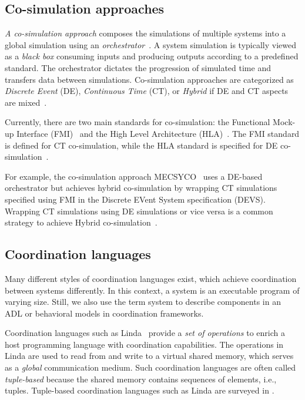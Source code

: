 \documentclass[runningheads]{llncs}
\begin{document}
\subsection{Co-simulation approaches} \label{subsec: cosim}

\textit{A co-simulation approach} composes the simulations of multiple systems into a global simulation using an \textit{orchestrator}~\cite{gomesCoSimulationSurvey2019}.
A system simulation is typically viewed as a \textit{black box} consuming inputs and producing outputs according to a predefined standard.
The orchestrator dictates the progression of simulated time and transfers data between simulations.
Co-simulation approaches are categorized as \textit{Discrete Event} (DE), \textit{Continuous Time} (CT), or \textit{Hybrid} if DE and CT aspects are mixed~\cite{gomesCoSimulationSurvey2019}.

Currently, there are two main standards for co-simulation: the Functional Mock-up Interface (FMI)~\cite{modelisarFunctionalMockupInterface2023} and the High Level Architecture (HLA)~\cite{dahmannHighLevelArchitecture1997}.
The FMI standard is defined for CT co-simulation, while the HLA standard is specified for DE co-simulation~\cite{gomesCoSimulationSurvey2019,liboniComplexSystemsCosimulation2021}.

For example, the co-simulation approach MECSYCO~\cite{camusHybridCosimulationFMUs2016,camusCosimulationCyberphysicalSystems2018} uses a DE-based orchestrator but achieves hybrid co-simulation by wrapping CT simulations specified using FMI in the Discrete EVent System specification (DEVS).
Wrapping CT simulations using DE simulations or vice versa is a common strategy to achieve Hybrid co-simulation~\cite{gomesCoSimulationSurvey2019}.

\subsection{Coordination languages} \label{subsec: coordlang}
Many different styles of coordination languages exist, which achieve coordination between systems differently.
In this context, a system is an executable program of varying size.
Still, we also use the term system to describe components in an ADL or behavioral models in coordination frameworks.

Coordination languages such as Linda~\cite{carrieroLindaContext1989} provide a \textit{set of operations} to enrich a host programming language with coordination capabilities.
The operations in Linda are used to read from and write to a virtual shared memory, which serves as a \textit{global} communication medium.
Such coordination languages are often called \textit{tuple-based} because the shared memory contains sequences of elements, i.e., tuples.
Tuple-based coordination languages such as Linda are surveyed in \cite{rossiTuplebasedTechnologiesCoordination2001,nixonTuplespacebasedComputingSemantic2008,omiciniCoordinationModelsLanguages2011}.
\end{document}
